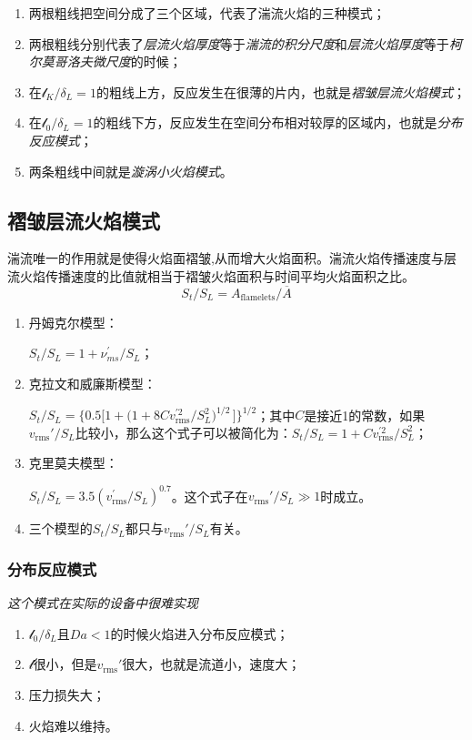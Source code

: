 \begin{enumerate}
    \item 两根粗线把空间分成了三个区域，代表了湍流火焰的三种模式；
    \item 两根粗线分别代表了\textit{层流火焰厚度}等于\textit{湍流的积分尺度}和\textit{层流火焰厚度}等于\textit{柯尔莫哥洛夫微尺度}的时候；
    \item 在\(\mathcal{l}_K/\delta_L=1\)的粗线上方，反应发生在很薄的片内，也就是\textit{褶皱层流火焰模式}；
    \item 在\(\mathcal{l}_0/\delta_L=1\)的粗线下方，反应发生在空间分布相对较厚的区域内，也就是\textit{分布反应模式}；
    \item 两条粗线中间就是\textit{漩涡小火焰模式}。
\end{enumerate}

\subsection{褶皱层流火焰模式}
湍流唯一的作用就是使得火焰面褶皱,从而增大火焰面积。湍流火焰传播速度与层流火焰传播速度的比值就相当于褶皱火焰面积与时间平均火焰面积之比。
\begin{equation}
    S_t/S_L = A_\mathrm{flamelets}/\overline{A}
\end{equation}

\begin{enumerate}
    \item 丹姆克尔模型：
    
    \(S_{t}/S_{L}=1+\nu_{m s}^{\prime}/S_{L}\)；
    \item 克拉文和威廉斯模型：
    
    \(S_{t}/S_{L}=\Big\{0.5\Big[1+\Big(1+8C v_\mathrm{rms}^{\prime2}/S_{L}^{2}\Big)^{1/2}\,\Big]\Big\}^{1/2}\)；其中\(C\)是接近1的常数，如果\(v_\mathrm{rms}'/S_L\)比较小，那么这个式子可以被简化为：\(S_{t}/S_{L}=1+C v_\mathrm{rms}^{\prime2}/S_{L}^{2}\)；
    \item 克里莫夫模型：
    
    \(S_{t}/S_{L}=3.5(v_\mathrm{rms}^{\prime}/S_{L})^{0.7}\)。这个式子在\(v_\mathrm{rms}'/S_L\gg 1\)时成立。

    \item 三个模型的\(S_t/S_L\)都只与\(v_\mathrm{rms}'/S_L\)有关。
\end{enumerate}

\subsubsection{分布反应模式}
\textit{这个模式在实际的设备中很难实现}
\begin{enumerate}
    \item \(\mathcal{l}_0/\delta_L\)且\(Da<1\)的时候火焰进入分布反应模式；
    \item \(\mathcal{l}\)很小，但是\(v_\mathrm{rms}'\)很大，也就是流道小，速度大；
    \item 压力损失大；
    \item 火焰难以维持。
\end{enumerate}

